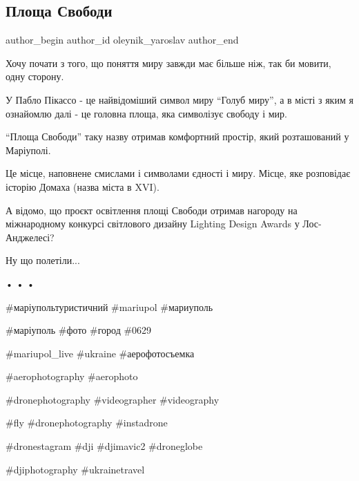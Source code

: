  
 
 
 
 

\subsection{Площа Свободи}
\label{sec:22_10_2021.fb.oleynik_yaroslav.1.ploscha_svobody}

\ifcmt
 author_begin
   author_id oleynik_yaroslav
 author_end
\fi

Хочу почати з того, що поняття  миру завжди має більше ніж, так би мовити, одну
сторону.

У Пабло Пікассо  - це найвідоміший символ миру \enquote{Голуб миру}, а в місті
з яким я ознайомлю далі - це головна площа, яка символізує свободу і мир.

\enquote{Площа Свободи} таку назву отримав комфортний простір, який розташований у
Маріуполі. 

Це місце, наповнене смислами і символами єдності і миру. Місце, яке розповідає
історію Домаха (назва міста в XVI).

А відомо, що проєкт освітлення площі Свободи отримав нагороду на міжнародному
конкурсі світлового дизайну Lighting Design Awards у Лос-Анджелесі?

Ну що полетіли...

•
•
•

\#маріупольтуристичний \#mariupol \#мариуполь 

\#маріуполь \#фото \#город \#0629

\#mariupol\_live \#ukraine \#аерофотосъемка 

\#aerophotography \#aerophoto

\#dronephotography \#videographer \#videography 

\#fly \#dronephotography \#instadrone

\#dronestagram \#dji \#djimavic2 \#droneglobe 

\#djiphotography \#ukrainetravel
